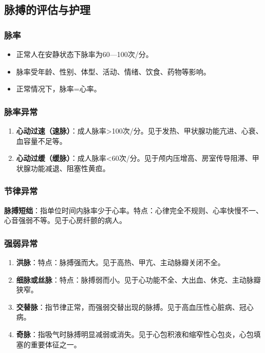 \documentclass[11pt, a4paper]{ctexart}
\begin{document}
\subsection{脉搏的评估与护理}
\subsubsection{脉率}
\begin{itemize}
    \item 正常人在安静状态下脉率为60—100次/分。
    \item 脉率受年龄、性别、体型、活动、情绪、饮食、药物等影响。
    \item 正常情况下，脉率=心率。
\end{itemize}

\subsubsection{脉率异常}
\begin{enumerate}
    \item \textbf{心动过速（速脉）}：成人脉率>100次/分。见于发热、甲状腺功能亢进、心衰、血容量不足等。
    \item \textbf{心动过缓（缓脉）}：成人脉率<60次/分。见于颅内压增高、房室传导阻滞、甲状腺功能减退、阻塞性黄疸。
\end{enumerate}

\subsubsection{节律异常}
\textbf{脉搏短绌}：指单位时间内脉率少于心率。特点：心律完全不规则、心率快慢不一、心音强弱不等。见于心房纤颤的病人。

\subsubsection{强弱异常}
\begin{enumerate}
    \item \textbf{洪脉}：特点：脉搏强而大。见于高热、甲亢、主动脉瓣关闭不全。
    \item \textbf{细脉或丝脉}：特点：脉搏弱而小。见于心功能不全、大出血、休克、主动脉瓣狭窄。
    \item \textbf{交替脉}：指节律正常，而强弱交替出现的脉搏。见于高血压性心脏病、冠心病。
    \item \textbf{奇脉}：指吸气时脉搏明显减弱或消失。见于心包积液和缩窄性心包炎，心包填塞的重要体征之一。
\end{enumerate}
\end{document}
